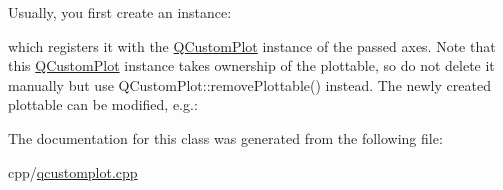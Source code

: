 Usually, you first create an instance\+: 
\begin{DoxyCodeInclude}
\end{DoxyCodeInclude}
which registers it with the \mbox{\hyperlink{class_q_custom_plot}{Q\+Custom\+Plot}} instance of the passed axes. Note that this \mbox{\hyperlink{class_q_custom_plot}{Q\+Custom\+Plot}} instance takes ownership of the plottable, so do not delete it manually but use Q\+Custom\+Plot\+::remove\+Plottable() instead. The newly created plottable can be modified, e.\+g.\+: 
\begin{DoxyCodeInclude}
\end{DoxyCodeInclude}


The documentation for this class was generated from the following file\+:\begin{DoxyCompactItemize}
\item 
cpp/\mbox{\hyperlink{qcustomplot_8cpp}{qcustomplot.\+cpp}}\end{DoxyCompactItemize}
